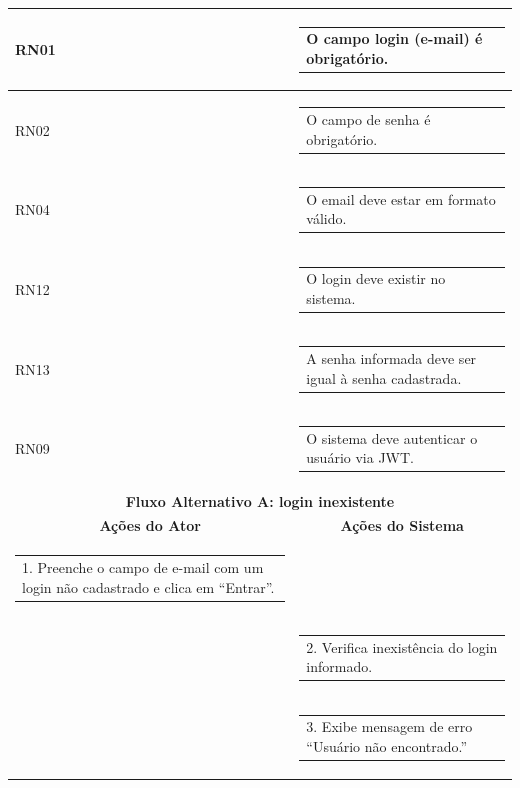 \begin{longtable}[c]{|p{}|p{}|}
\multicolumn{1}{|p{0.48\textwidth}|}{RN01} &
  \begin{tabular}[c]{@{}p{}@{}}O campo login (e-mail) é obrigatório.\end{tabular} \\ \hline
\multicolumn{1}{|p{0.48\textwidth}|}{RN02} &
  \begin{tabular}[c]{@{}p{}@{}}O campo de senha é obrigatório.\end{tabular} \\ \hline
\multicolumn{1}{|p{0.48\textwidth}|}{RN04} &
  \begin{tabular}[c]{@{}p{}@{}}O email deve estar em formato válido.\end{tabular} \\ \hline
\multicolumn{1}{|p{0.48\textwidth}|}{RN12} &
  \begin{tabular}[c]{@{}p{}@{}}O login deve existir no sistema.\end{tabular} \\ \hline
\multicolumn{1}{|p{0.48\textwidth}|}{RN13} &
  \begin{tabular}[c]{@{}p{}@{}}A senha informada deve ser igual à senha cadastrada.\end{tabular} \\ \hline
\multicolumn{1}{|p{0.48\textwidth}|}{RN09} &
  \begin{tabular}[c]{@{}p{}@{}}O sistema deve autenticar o usuário via JWT.\end{tabular} \\ \hline
\multicolumn{2}{|c|}{\textbf{Fluxo Alternativo A: login inexistente}} \\ \hline
\multicolumn{1}{|c|}{\textbf{Ações do Ator}} &
  \multicolumn{1}{c|}{\textbf{Ações do Sistema}} \\ \hline
\multicolumn{1}{|p{0.48\textwidth}|}{\begin{tabular}[c]{@{}p{}@{}}1. Preenche o campo de e-mail com um login não cadastrado e clica em ``Entrar''.\end{tabular}} &
   \\ \hline
\multicolumn{1}{|p{0.48\textwidth}|}{} &
  \begin{tabular}[c]{@{}p{}@{}}2. Verifica inexistência do login informado.\end{tabular} \\ \hline
\multicolumn{1}{|p{0.48\textwidth}|}{} &
  \begin{tabular}[c]{@{}p{}@{}}3. Exibe mensagem de erro ``Usuário não encontrado.''\end{tabular} \\ \hline

\end{longtable}
